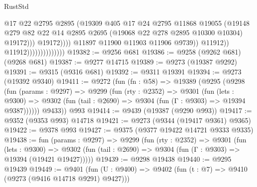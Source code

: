 \begin{lexlean}{RustStd}
\begin{coremodule}
                                                  @17
                                                  @22
                                                  @2795
                                                  @2895
                                                  (@19309
                                                    @405
                                                    @17
                                                    @24
                                                    @2795
                                                    @11868
                                                    @19055
                                                    (@19148
                                                      @279
                                                      @82
                                                      @22
                                                      @14
                                                      @2895
                                                      @2695
                                                      (@19068 @22 @278 @2895 @10300 @10304)
                                                      @19172)))
                                                @19172))))
                                        @11897
                                        @11900
                                        @11903
                                        @11906
                                        @9739))
                                    @11912))
                                @11912))))))))))))))
@19382 := @9256 @681
@19386 := @9258 (@9262 @681) (@9268 @681)
@19387 := @9277 @14715
@19389 := @9273 (@19387 @9292)
@19391 := @9315 (@9316 @681)
@19392 := @9311 @19391
@19394 := @9273 (@19392 @9340)
@19411 := @9272
    (fun (fn : @58) =>
    @19389
      (@9295
        (@9298
          (fun (params : @9297) =>
          @9299
            (fun (rty : @2352) =>
            @9301
              (fun (lets : @9300) =>
              @9302 (fun (tail : @2690) => @9304 (fun (Γ : @9303) => @19394 @9387))))))
        @9433))
    @993
@19414 := @9439 (@19387 (@9290 @993))
@19417 := @9352 (@9353 @993) @14718
@19421 := @9273 (@9344 (@19417 @9361) @9365)
@19422 := @9378 @993
@19427 := @9375 (@9377 @19422 @14721 @9333 @9335)
@19438 := fun (params : @9297) =>
  @9299
    (fun (rty : @2352) =>
    @9301
      (fun (lets : @9300) =>
      @9302 (fun (tail : @2690) => @9304 (fun (Γ : @9303) => @19394 (@19421 @19427)))))
@19439 := @9298 @19438
@19440 := @9295 @19439
@19449 := @9401
    (fun (U : @9400) => @9402 (fun (t : @7) => @9410 (@9273 (@9416 @14718 @9291) @9427)))

\end{coremodule}
\end{lexlean}
